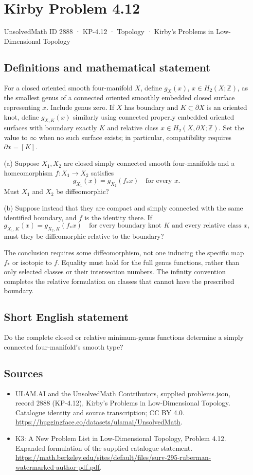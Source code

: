 \documentclass[11pt,a4paper]{article}
\begin{document}
\section*{Kirby Problem 4.12}\label{2888}
{\small UnsolvedMath ID 2888 · KP-4.12 · Topology · Kirby's Problems in Low-Dimensional Topology}
\subsection{Definitions and mathematical statement}
For a closed oriented smooth four-manifold $X$, define $g_X(x)$, $x\in H_2(X;\mathbb Z)$, as the smallest genus of a connected oriented smoothly embedded closed surface representing $x$. Include genus zero. If $X$ has boundary and $K\subset\partial X$ is an oriented knot, define $g_{X,K}(x)$ similarly using connected properly embedded oriented surfaces with boundary exactly $K$ and relative class $x\in H_2(X,\partial X;\mathbb Z)$. Set the value to $\infty$ when no such surface exists; in particular, compatibility requires $\partial x=[K]$.

(a) Suppose $X_1,X_2$ are closed simply connected smooth four-manifolds and a homeomorphism $f:X_1\to X_2$ satisfies
\[
g_{X_1}(x)=g_{X_2}(f_*x)\quad\text{for every }x.
\]
Must $X_1$ and $X_2$ be diffeomorphic?

(b) Suppose instead that they are compact and simply connected with the same identified boundary, and $f$ is the identity there. If
\[
g_{X_1,K}(x)=g_{X_2,K}(f_*x)
\quad\text{for every boundary knot }K\text{ and every relative class }x,
\]
must they be diffeomorphic relative to the boundary?

The conclusion requires some diffeomorphism, not one inducing the specific map $f_*$ or isotopic to $f$. Equality must hold for the full genus functions, rather than only selected classes or their intersection numbers. The infinity convention completes the relative formulation on classes that cannot have the prescribed boundary.
\subsection{Short English statement}
Do the complete closed or relative minimum-genus functions determine a simply connected four-manifold's smooth type?
\subsection{Sources}
\begin{itemize}
\item[S1] ULAM.AI and the UnsolvedMath Contributors, supplied problems.json, record 2888 (KP-4.12), Kirby's Problems in Low-Dimensional Topology. Catalogue identity and source transcription; CC BY 4.0.
\url{https://huggingface.co/datasets/ulamai/UnsolvedMath}.
\item[S2] K3: A New Problem List in Low-Dimensional Topology, Problem 4.12. Expanded formulation of the supplied catalogue statement.
\url{https://math.berkeley.edu/sites/default/files/surv-295-ruberman-watermarked-author-pdf.pdf}.
\end{itemize}
\end{document}

